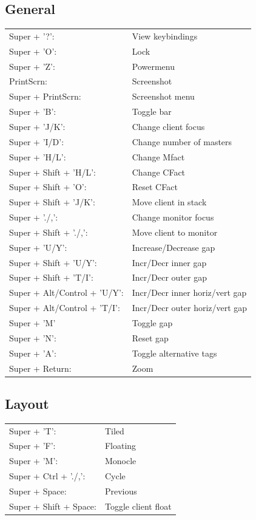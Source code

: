 \documentclass[11pt]{article}
\begin{document}
\subsection{General}
\label{sec:org1ed28b5}
\begin{flushleft}
\begin{tabular}{ll}
Super + '?': & View keybindings\\
Super + 'O': & Lock\\
Super + 'Z': & Powermenu\\
PrintScrn: & Screenshot\\
Super + PrintScrn: & Screenshot menu\\
Super + 'B': & Toggle bar\\
Super + 'J/K': & Change client focus\\
Super + 'I/D': & Change number of masters\\
Super + 'H/L': & Change Mfact\\
Super + Shift + 'H/L': & Change CFact\\
Super + Shift + 'O': & Reset CFact\\
Super + Shift + 'J/K': & Move client in stack\\
Super + './,': & Change monitor focus\\
Super + Shift + './,': & Move client to monitor\\
Super + 'U/Y': & Increase/Decrease gap\\
Super + Shift + 'U/Y': & Incr/Decr inner gap\\
Super + Shift + 'T/I': & Incr/Decr outer gap\\
Super + Alt/Control + 'U/Y': & Incr/Decr inner horiz/vert gap\\
Super + Alt/Control + 'T/I': & Incr/Decr outer horiz/vert gap\\
Super + 'M' & Toggle gap\\
Super + 'N': & Reset gap\\
Super + 'A': & Toggle alternative tags\\
Super + Return: & Zoom\\
\end{tabular}
\end{flushleft}
\subsection{Layout}
\label{sec:orged46a86}
\begin{flushleft}
\begin{tabular}{ll}
Super + 'T': & Tiled\\
Super + 'F': & Floating\\
Super + 'M': & Monocle\\
Super + Ctrl + './,': & Cycle\\
Super + Space: & Previous\\
Super + Shift + Space: & Toggle client float\\
\end{tabular}
\end{flushleft}
\end{document}
